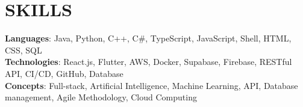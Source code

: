\section{SKILLS}
\begin{itemize}[leftmargin=0.15in, label={}]
	\small{\item{
	      \textbf{Languages}{: Java, Python, C++, C\#, TypeScript, JavaScript, Shell, HTML, CSS, SQL} \\
	      \textbf{Technologies}{: React.js, Flutter, AWS, Docker, Supabase, Firebase, RESTful API, CI/CD, GitHub, Database} \\
	      \textbf{Concepts}{: Full-stack, Artificial Intelligence, Machine Learning, API, Database management, Agile Methodology, Cloud Computing}
	      }}
\end{itemize}